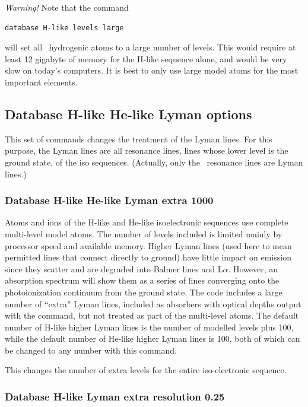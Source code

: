 \emph{Warning!}  Note that the command
\begin{verbatim}
database H-like levels large
\end{verbatim}
will set all \LIMELM\ hydrogenic atoms to a large number of levels.
This would
require at least 12 gigabyte of memory for the H-like sequence alone,
and would be very slow on today's computers.
It is best to only use large model atoms for the
most important elements.

\subsection{Database H-like \OR{} He-like Lyman options}

This set of commands changes the treatment of the Lyman lines.
For this purpose, the Lyman lines are all resonance lines,
lines whose lower level is the ground state,  of the  iso sequences.
(Actually, only the \hi\ resonance lines are Lyman lines.)

\subsubsection{Database H-like \OR{} He-like Lyman extra 1000}  

Atoms and ions of the H-like and He-like
isoelectronic sequences use complete multi-level model atoms.
The number of levels included is limited mainly by processor speed and
available memory.
Higher Lyman lines (used here to mean permitted lines that connect directly
to ground) have little impact on emission since they
scatter and are degraded
into Balmer lines and L$\alpha $.
However, an absorption spectrum will show them
as a series of lines converging onto the photoionization continuum from
the ground state.
The code includes a large number of ``extra'' Lyman lines,
included as absorbers with optical depths output with
the  command,
but not treated as part of the multi-level atoms.
The default number of H-like higher Lyman lines is the
number of modelled levels plus 100, while the default number
of He-like higher Lyman lines is 100, both of which can be
changed to any number with this command.

This changes the number of extra levels for the entire iso-electronic sequence.

\subsubsection{Database H-like Lyman extra resolution 0.25}

